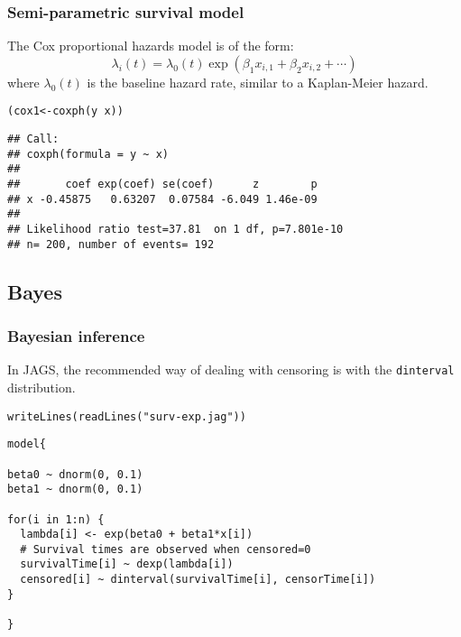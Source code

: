 \documentclass[color=usenames,dvipsnames]{beamer}\usepackage[]{graphicx}\usepackage[]{color}
\makeatletter
\newcommand{\hlstr}[1]{\textcolor[rgb]{0.749,0.012,0.012}{#1}}%
\newcommand{\hlopt}[1]{\textcolor[rgb]{0,0,0}{#1}}%
\newcommand{\hlstd}[1]{\textcolor[rgb]{0,0,0}{#1}}%
\newcommand{\hlkwb}[1]{\textcolor[rgb]{0,0.341,0.682}{#1}}%
\newcommand{\hlkwd}[1]{\textcolor[rgb]{0.004,0.004,0.506}{#1}}%
\newenvironment{kframe}{%
 \def\at@end@of@kframe{}%
 \ifinner\ifhmode%
  \def\at@end@of@kframe{\end{minipage}}%
  \begin{minipage}{\columnwidth}%
 \fi\fi%
 \def\FrameCommand##1{\hskip\@totalleftmargin \hskip-\fboxsep
 \colorbox{shadecolor}{##1}\hskip-\fboxsep
     \hskip-\linewidth \hskip-\@totalleftmargin \hskip\columnwidth}%
 \MakeFramed {\advance\hsize-\width
   \@totalleftmargin\z@ \linewidth\hsize
   \@setminipage}}%
 {\par\unskip\endMakeFramed%
 \at@end@of@kframe}
\newenvironment{knitrout}{}{} %
\newcommand{\inr}[1]{\colorbox{inlinecolor}{\texttt{#1}}}
\makeatother
\begin{document}
\begin{frame}[fragile]
  \frametitle{Semi-parametric survival model}
  The Cox proportional hazards model is of the form:
  \[
    \lambda_i(t) = \lambda_0(t)\exp(\beta_1 x_{i,1} + \beta_2 x_{i,2} + \cdots)
  \]
  where $\lambda_0(t)$ is the baseline hazard rate, similar to a
  Kaplan-Meier hazard.
  \pause \vfill
\begin{knitrout}\scriptsize
{}\color{fgcolor}\begin{kframe}
\begin{alltt}
\hlstd{(cox1} \hlkwb{<-} \hlkwd{coxph}\hlstd{(y} \hlopt{~} \hlstd{x))}
\end{alltt}
\begin{verbatim}
## Call:
## coxph(formula = y ~ x)
## 
##       coef exp(coef) se(coef)      z        p
## x -0.45875   0.63207  0.07584 -6.049 1.46e-09
## 
## Likelihood ratio test=37.81  on 1 df, p=7.801e-10
## n= 200, number of events= 192
\end{verbatim}
\end{kframe}
\end{knitrout}
\end{frame}




\subsection{Bayes}


\begin{frame}[fragile]
  \frametitle{Bayesian inference}
  In JAGS, the recommended way of dealing with censoring is with the
  \inr{dinterval} distribution. 
\begin{knitrout}
\color{fgcolor}\begin{kframe}
\begin{alltt}
\hlkwd{writeLines}\hlstd{(}\hlkwd{readLines}\hlstd{(}\hlstr{"surv-exp.jag"}\hlstd{))}
\end{alltt}
\end{kframe}
\end{knitrout}
\begin{knitrout}\footnotesize
{}\color{fgcolor}\begin{kframe}
\begin{verbatim}
model{

beta0 ~ dnorm(0, 0.1)
beta1 ~ dnorm(0, 0.1)

for(i in 1:n) {
  lambda[i] <- exp(beta0 + beta1*x[i])
  # Survival times are observed when censored=0 
  survivalTime[i] ~ dexp(lambda[i])
  censored[i] ~ dinterval(survivalTime[i], censorTime[i])
}

}
\end{verbatim}
\end{kframe}
\end{knitrout}
\end{frame}
\end{document}
